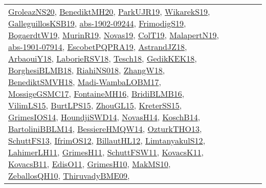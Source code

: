 {\begin{longtable}{lp{3cm}>{\raggedright}p{6cm}>{\raggedright}p{6cm}p{8cm}}
\href{papers/GroleazNS20.pdf}{GroleazNS20}\cite{GroleazNS20}, \href{articles/BenediktMH20.pdf}{BenediktMH20}\cite{BenediktMH20}, \href{papers/ParkUJR19.pdf}{ParkUJR19}\cite{ParkUJR19}, \href{articles/WikarekS19.pdf}{WikarekS19}\cite{WikarekS19}, \href{papers/GalleguillosKSB19.pdf}{GalleguillosKSB19}\cite{GalleguillosKSB19}, \href{articles/abs-1902-09244.pdf}{abs-1902-09244}\cite{abs-1902-09244}, \href{papers/FrimodigS19.pdf}{FrimodigS19}\cite{FrimodigS19}, \href{papers/BogaerdtW19.pdf}{BogaerdtW19}\cite{BogaerdtW19}, \href{papers/MurinR19.pdf}{MurinR19}\cite{MurinR19}, \href{articles/Novas19.pdf}{Novas19}\cite{Novas19}, \href{papers/ColT19.pdf}{ColT19}\cite{ColT19}, \href{papers/MalapertN19.pdf}{MalapertN19}\cite{MalapertN19}, \href{articles/abs-1901-07914.pdf}{abs-1901-07914}\cite{abs-1901-07914}, \href{articles/EscobetPQPRA19.pdf}{EscobetPQPRA19}\cite{EscobetPQPRA19}, \href{papers/AstrandJZ18.pdf}{AstrandJZ18}\cite{AstrandJZ18}, \href{papers/ArbaouiY18.pdf}{ArbaouiY18}\cite{ArbaouiY18}, \href{articles/LaborieRSV18.pdf}{LaborieRSV18}\cite{LaborieRSV18}, \href{papers/Tesch18.pdf}{Tesch18}\cite{Tesch18}, \href{articles/GedikKEK18.pdf}{GedikKEK18}\cite{GedikKEK18}, \href{articles/BorghesiBLMB18.pdf}{BorghesiBLMB18}\cite{BorghesiBLMB18}, \href{papers/RiahiNS018.pdf}{RiahiNS018}\cite{RiahiNS018}, \href{articles/ZhangW18.pdf}{ZhangW18}\cite{ZhangW18}, \href{papers/BenediktSMVH18.pdf}{BenediktSMVH18}\cite{BenediktSMVH18}, \href{papers/Madi-WambaLOBM17.pdf}{Madi-WambaLOBM17}\cite{Madi-WambaLOBM17}, \href{papers/MossigeGSMC17.pdf}{MossigeGSMC17}\cite{MossigeGSMC17}, \href{papers/FontaineMH16.pdf}{FontaineMH16}\cite{FontaineMH16}, \href{articles/BridiBLMB16.pdf}{BridiBLMB16}\cite{BridiBLMB16}, \href{papers/VilimLS15.pdf}{VilimLS15}\cite{VilimLS15}, \href{papers/BurtLPS15.pdf}{BurtLPS15}\cite{BurtLPS15}, \href{papers/ZhouGL15.pdf}{ZhouGL15}\cite{ZhouGL15}, \href{papers/KreterSS15.pdf}{KreterSS15}\cite{KreterSS15}, \href{articles/GrimesIOS14.pdf}{GrimesIOS14}\cite{GrimesIOS14}, \href{papers/HoundjiSWD14.pdf}{HoundjiSWD14}\cite{HoundjiSWD14}, \href{articles/NovasH14.pdf}{NovasH14}\cite{NovasH14}, \href{papers/KoschB14.pdf}{KoschB14}\cite{KoschB14}, \href{papers/BartoliniBBLM14.pdf}{BartoliniBBLM14}\cite{BartoliniBBLM14}, \href{papers/BessiereHMQW14.pdf}{BessiereHMQW14}\cite{BessiereHMQW14}, \href{articles/OzturkTHO13.pdf}{OzturkTHO13}\cite{OzturkTHO13}, \href{papers/SchuttFS13.pdf}{SchuttFS13}\cite{SchuttFS13}, \href{papers/IfrimOS12.pdf}{IfrimOS12}\cite{IfrimOS12}, \href{papers/BillautHL12.pdf}{BillautHL12}\cite{BillautHL12}, \href{articles/LimtanyakulS12.pdf}{LimtanyakulS12}\cite{LimtanyakulS12}, \href{papers/LahimerLH11.pdf}{LahimerLH11}\cite{LahimerLH11}, \href{papers/GrimesH11.pdf}{GrimesH11}\cite{GrimesH11}, \href{articles/SchuttFSW11.pdf}{SchuttFSW11}\cite{SchuttFSW11}, \href{articles/KovacsK11.pdf}{KovacsK11}\cite{KovacsK11}, \href{articles/KovacsB11.pdf}{KovacsB11}\cite{KovacsB11}, \href{papers/EdisO11.pdf}{EdisO11}\cite{EdisO11}, \href{papers/GrimesH10.pdf}{GrimesH10}\cite{GrimesH10}, \href{papers/MakMS10.pdf}{MakMS10}\cite{MakMS10}, \href{articles/ZeballosQH10.pdf}{ZeballosQH10}\cite{ZeballosQH10}, \href{papers/ThiruvadyBME09.pdf}{ThiruvadyBME09}\cite{ThiruvadyBME09}, 
\end{longtable}}
